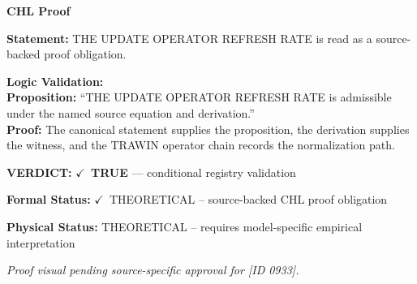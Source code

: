 \vspace{0.45em}
\noindent\textbf{CHL Proof}\par
\textbf{Statement:} THE UPDATE OPERATOR REFRESH RATE is read as a source-backed proof obligation.

\textbf{Logic Validation:}\\
\textbf{Proposition:} ``THE UPDATE OPERATOR REFRESH RATE is admissible under the named source equation and derivation.''\\
\textbf{Proof:} The canonical statement supplies the proposition, the derivation supplies the witness, and the TRAWIN operator chain records the normalization path.

\textbf{VERDICT:} \ensuremath{\checkmark}\ \textbf{TRUE} --- conditional registry validation

\textbf{Formal Status:} \ensuremath{\checkmark}\ THEORETICAL -- source-backed CHL proof obligation

\textbf{Physical Status:} THEORETICAL -- requires model-specific empirical interpretation
\par\vspace{0.45em}
\par
\vfill
\begingroup\footnotesize\itshape
Proof visual pending source-specific approval for [ID 0933].
\par\endgroup
\vfill
\endgroup
\endgroup
